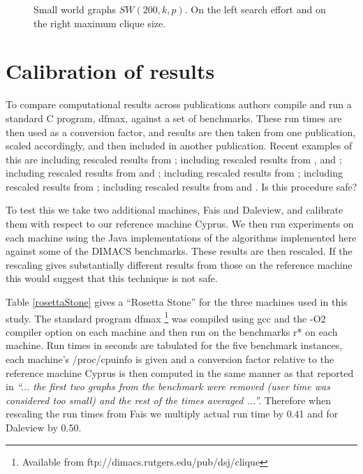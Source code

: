 \documentclass{l4proj}
\begin{document}
\begin{figure}
\begin{center}
\begin{minipage}[t]{0.49\textwidth}
\end{minipage}
\end{center}
\vspace{-1cm}
\caption{Small world graphs $SW(200,k,p)$. On the left search effort and on the right maximum clique size.}
\label{smallWorld}
\end{figure}

\section{Calibration of results}
To compare computational results across publications authors compile and run a standard C program, dfmax, against a 
set of benchmarks. These run times are then used as a conversion factor, 
and results are then taken from one publication, scaled accordingly, and then included in another publication. Recent examples of this are
\cite{prjo2002} including rescaled results from \cite{sewell98};
\cite{regin2003} including rescaled results from \cite{prjo2002}, \cite{wood97} and \cite{fahle};
\cite{tomita2007} including rescaled results from \cite{prjo2002} and \cite{sewell98};
\cite{segundo2011} including rescaled  results from \cite{Konc_Janezic_2007}; 
\cite{segundo2011b} including rescaled  results from \cite{segundo2011};
\cite{aaai2010} including rescaled results from \cite{tomita2007} and \cite{regin2003}.
Is this procedure safe?

To test this we take two additional machines, Fais and Daleview, and calibrate them with respect to our reference machine Cyprus. 
We then run experiments 
on each machine using the Java implementations of the algorithms implemented here against some of the DIMACS benchmarks. These results are
then rescaled. If the rescaling gives substantially different results from those on the reference machine
this would suggest that this technique is not safe.

Table \ref{rosettaStone} gives a ``Rosetta Stone'' for the three machines used in this study.
The standard program dfmax \footnote{Available from ftp://dimacs.rutgers.edu/pub/dsj/clique} was compiled using 
gcc and the -O2 compiler option on each machine and then run
on the benchmarks r* on each machine. Run times in seconds are tabulated for the five benchmark instances,
each machine's /proc/cpuinfo is given and a conversion factor relative to the reference machine Cyprus
is then computed in the same manner as that reported in
\cite{segundo2011} \emph{``... the first two graphs from the benchmark were removed (user time was considered too small) and the rest
of the times averaged ...''.}  Therefore when rescaling the run times from Fais we
multiply actual run time by 0.41 and for Daleview by 0.50.
\end{document}
